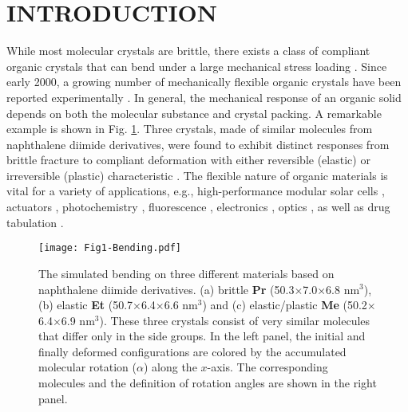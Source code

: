 \documentclass[prb,superscriptaddress,longbibliography, twocolumn]{revtex4-1}
\begin{document}
\section{INTRODUCTION}
While most molecular crystals are brittle, there exists a class of compliant organic crystals that can bend under a large mechanical stress loading \cite{naumov2015mechanically, saha2018molecules}. Since early 2000, a growing number of mechanically flexible organic crystals have been reported experimentally \cite{reddy2006structure, Takamizawa2013Superelastic, ghosh2012elastic, panda2015spatially, krishna2016mechanically, yadav2019molecular, raju2018rationalizing, mishra2020conformation, zhang2021structural}. In general, the mechanical response of an organic solid depends on both the molecular substance and crystal packing. A remarkable example is shown in Fig. \ref{Fig1}. Three crystals, made of similar molecules from naphthalene diimide derivatives, were found to exhibit distinct responses from brittle fracture to compliant deformation with either reversible (elastic) or irreversible (plastic) characteristic \cite{devarapalli2019remarkably}. The flexible nature of organic materials is vital for a variety of applications, e.g., high-performance modular solar cells \cite{root2017mechanical}, actuators \cite{li2019martensitic}, photochemistry \cite{mutai2021organic}, fluorescence \cite{di2022fluorescence, hayashi2016elastic}, electronics \cite{wang2019organic, samanta2023elastic}, optics \cite{liu2018highly}, as well as drug tabulation \cite{sun2017microstructure}. 

\begin{figure}[htbp]
\centering
\texttt{[image: Fig1-Bending.pdf]}
\caption{\label{Fig1} The simulated bending on three different materials based on naphthalene diimide derivatives. (a) brittle \textbf{Pr} (50.3$\times$7.0$\times$6.8 nm$^3$), (b) elastic \textbf{Et} (50.7$\times$6.4$\times$6.6 nm$^3$) and (c) elastic/plastic \textbf{Me} (50.2$\times$6.4$\times$6.9 nm$^3$). These three crystals consist of very similar molecules that differ only in the side groups. In the left panel, the initial and finally deformed configurations are colored by the accumulated molecular rotation ($\alpha$) along the $x$-axis. The corresponding molecules and the definition of rotation angles are shown in the right panel.} 
\vspace{-5mm}
\end{figure}
\end{document}
